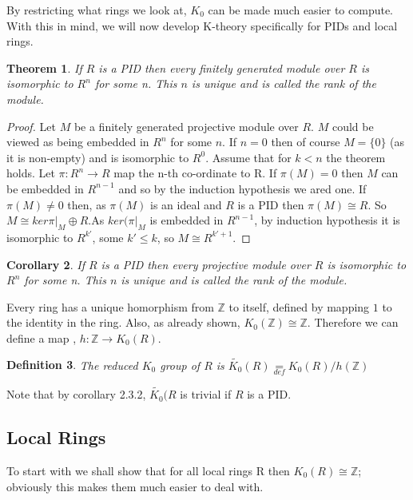 \documentclass[a4paper,10pt]{article}
\newtheorem{thm}{Theorem}[subsection]
\newtheorem{defn}[thm]{Definition}
\newtheorem{cor}[thm]{Corollary}
\begin{document}
By restricting what rings we look at, $K_{0}$ can be made much easier to compute. With this in mind, we will now develop K-theory specifically for PIDs and local rings.

\begin{thm}
	If $R$ is a PID then every finitely generated module over $R$ is isomorphic to $R^{n}$ for some n. This $n$ is unique and is called the rank of the module.
\end{thm}
\begin{proof}
	Let $M$ be a finitely generated projective module over $R$. $M$ could be viewed as being embedded in $R^{n}$ for some $n$. If $n=0$ then of course $M=\{0\}$ (as it is non-empty) and is isomorphic to $R^{0}$.
	Assume that for $k<n$ the theorem holds. Let $\pi :R^{n}\rightarrow R$ map the n-th co-ordinate to R. If $\pi (M)=0$ then $M$ can be embedded in $R^{n-1}$ and so by the induction hypothesis we ared one.
	If $\pi (M)\neq0$ then, as $\pi (M)$ is an ideal and $R$ is a PID then $\pi (M)\cong R$. So $M\cong ker\pi |_{M} \oplus R$.As $ker(\pi |_{M}$ is embedded in $R^{n-1}$, by induction hypothesis it is isomorphic to $R^{k'}$, some $k'\leq k$, so $M\cong R^{k'+1}$.
\end{proof}

\begin{cor}
	If $R$ is a PID then every projective module over $R$ is isomorphic to $R^{n}$ for some n. This $n$ is unique and is called the rank of the module.
\end{cor}

Every ring has a unique homorphism from $\mathbb{Z}$ to itself, defined by mapping $1$ to the identity in the ring. Also, as already shown, $K_{0}(\mathbb{Z})\cong \mathbb{Z}$. Therefore we can define a map , $h:\mathbb{Z}\rightarrow K_{0}(R)$.

\begin{defn}
	The reduced $K_{0}$ group of $R$ is $\tilde{K_{0}}(R)\underset{def}{=}K_{0}(R)/h(\mathbb{Z})$
\end{defn}

Note that by corollary 2.3.2, $\tilde{K_{0}}(R$ is trivial if $R$ is a PID.

\subsection{Local Rings}

To start with we shall show that for all local rings R then $K_{0}(R)\cong \mathbb{Z}$; obviously this makes them much easier to deal with.
\end{document}
